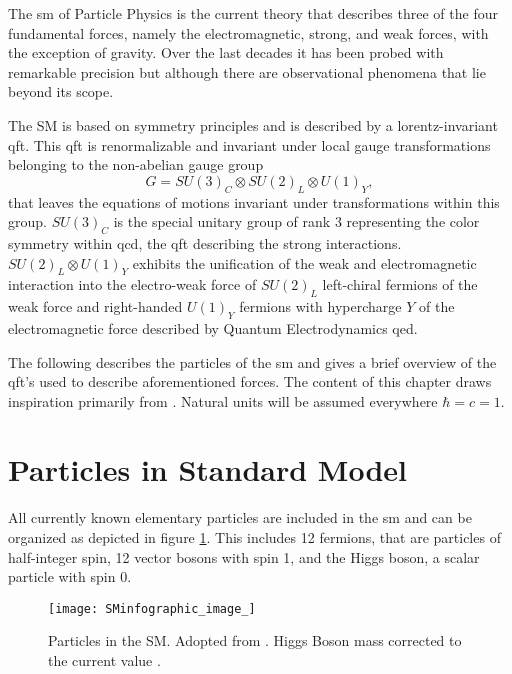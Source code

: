 The \ac{sm} of Particle Physics is the current theory that describes three of the four fundamental forces, namely the electromagnetic, strong, and weak forces, with the exception of gravity. Over the last decades it has been probed with remarkable precision but although there are  observational phenomena that lie beyond its scope. 

The SM is based on symmetry principles and is described by a lorentz-invariant \ac{qft}. This \ac{qft} is renormalizable and invariant under local gauge transformations belonging to the non-abelian gauge group 
\begin{equation}
    G = SU(3)_C \otimes SU(2)_L \otimes U(1)_Y,
\end{equation}
that leaves the equations of motions invariant under transformations within this group. $SU(3)_C$ is the special unitary group of rank 3 representing the color symmetry within \ac{qcd}, the \ac{qft} describing the strong interactions. $SU(2)_L \otimes U(1)_Y$ exhibits the unification of the weak and electromagnetic interaction into the electro-weak force of $SU(2)_L$ left-chiral fermions of the weak force and right-handed $U(1)_Y$ fermions with hypercharge $Y$ of the electromagnetic force described by Quantum Electrodynamics \ac{qed}. 

The following describes the particles of the \ac{sm} and gives a brief overview of the \ac{qft}'s used to describe aforementioned forces. The content of this chapter draws inspiration primarily from \citep{hollik2010quantum,griffiths2020introduction,thomson2013modern,zee2010quantum}. Natural units will be assumed everywhere $\hbar=c=1$.


\section{Particles in Standard Model}

All currently known elementary particles are included in the \ac{sm} and can be organized as depicted in figure \ref{fig:sm}. This includes 12 fermions, that are particles of half-integer spin, 12 vector bosons with spin 1, and the Higgs boson, a scalar particle with spin 0. 


\begin{figure}
    \centering
    \texttt{[image: SMinfographic\_image\_]}
        \caption[]{Particles in the SM. Adopted from \citep{smpar}. Higgs Boson mass corrected to the current value \citep{particle2022review}. }
    \label{fig:sm}    
\end{figure}


